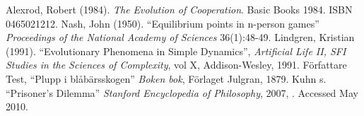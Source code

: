 \begin{thebibliography}{99}
 Alexrod, Robert (1984). \textit{The Evolution of Cooperation}. Basic Books 1984. ISBN 0465021212.
 Nash, John (1950). ``Equilibrium points in n-person games'' \textit{Proceedings of the National Academy of Sciences} 36(1):48-49.
 Lindgren, Kristian (1991). ``Evolutionary Phenomena in Simple Dynamics'', \textit{Artificial Life II, SFI Studies in the Sciences of Complexity}, vol X, Addison-Wesley, 1991.
 Författare Test, ``Plupp i blåbärsskogen'' \textit{Boken bok}, Förlaget Julgran, 1879.
 Kuhn s. ``Prisoner's Dilemma'' \textit{Stanford Encyclopedia of Philosophy}, 2007, . Accessed May 2010.
\end{thebibliography}
